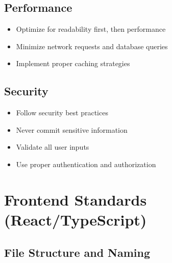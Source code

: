 \documentclass[12pt]{article}
\begin{document}
\subsection{Performance}
\begin{itemize}
    \item Optimize for readability first, then performance
    \item Minimize network requests and database queries
    \item Implement proper caching strategies
\end{itemize}

\subsection{Security}
\begin{itemize}
    \item Follow security best practices
    \item Never commit sensitive information
    \item Validate all user inputs
    \item Use proper authentication and authorization
\end{itemize}

\section{Frontend Standards (React/TypeScript)}

\subsection{File Structure and Naming}
\end{document}
